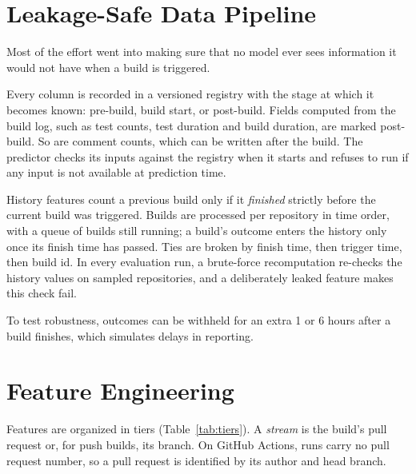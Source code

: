 \section{Leakage-Safe Data Pipeline}
\label{sec:pipeline}
Most of the effort went into making sure that no model ever sees information it would not have when a build is triggered.

Every column is recorded in a versioned registry with the stage at which it becomes known: pre-build, build start, or post-build. Fields computed from the build log, such as test counts, test duration and build duration, are marked post-build. So are comment counts, which can be written after the build. The predictor checks its inputs against the registry when it starts and refuses to run if any input is not available at prediction time.

History features count a previous build only if it \emph{finished} strictly before the current build was triggered. Builds are processed per repository in time order, with a queue of builds still running; a build's outcome enters the history only once its finish time has passed. Ties are broken by finish time, then trigger time, then build id. In every evaluation run, a brute-force recomputation re-checks the history values on sampled repositories, and a deliberately leaked feature makes this check fail.

To test robustness, outcomes can be withheld for an extra 1 or 6 hours after a build finishes, which simulates delays in reporting.

\section{Feature Engineering}
\label{sec:features}
Features are organized in tiers (Table~\ref{tab:tiers}). A \emph{stream} is the build's pull request or, for push builds, its branch. On GitHub Actions, runs carry no pull request number, so a pull request is identified by its author and head branch.

